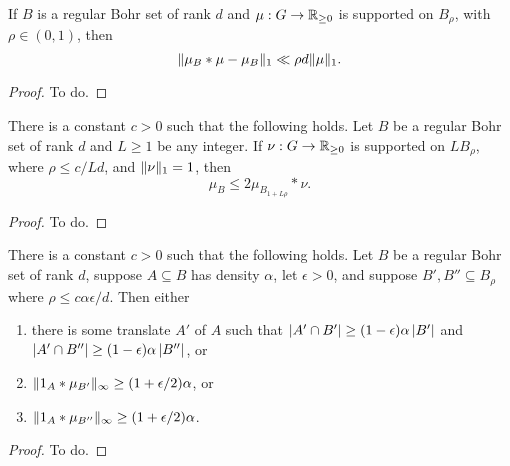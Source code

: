 \begin{lemma}
\label{reg-conv}
If $B$ is a regular Bohr set of rank $d$ and $\mu:G\to\mathbb{R}_{\geq 0}$ is supported on $B_\rho$, with $\rho \in (0,1)$, then
\[ \lVert  \mu_B*\mu - \mu_B \rVert_{1} \ll \rho d\lVert \mu\rVert_1. \]
\end{lemma}
\begin{proof}
To do.
\end{proof}

\begin{lemma}
\label{bohr-majorise}
There is a constant $c>0$ such that the following holds.  Let $B$ be a regular Bohr set of rank $d$ and $L\geq 1$ be any integer. If $\nu:G\to\mathbb{R}_{\geq 0}$ is supported on $L B_\rho$, where $\rho \leq c/Ld$, and $\lVert \nu\rVert_1=1$, then
\[\mu_B \leq 2\mu_{B_{1+L\rho}}\ast \nu.\]
\end{lemma}
\begin{proof}
To do.
\end{proof}

\begin{lemma}
\label{bourgain-trick}
There is a constant $c>0$ such that the following holds. Let $B$ be a regular Bohr set of rank $d$, suppose $A\subseteq B$ has density $\alpha$, let $\epsilon>0$, and suppose $B',B''\subseteq B_\rho$ where $\rho\leq c\alpha\epsilon/d$. Then either
\begin{enumerate}
\item there is some translate $A'$ of $A$ such that $\left\lvert A'\cap B'\right\rvert\geq (1-\epsilon)\alpha\left\lvert B'\right\rvert$ and $\left\lvert A'\cap B''\right\rvert\geq (1-\epsilon)\alpha \left\lvert B''\right\rvert$, or
\item $\lVert 1_{A}\ast \mu_{B'}\rVert_\infty\geq (1+\epsilon/2)\alpha$, or
\item $\lVert 1_{A}\ast \mu_{B''}\rVert_\infty \geq (1+\epsilon/2)\alpha$.
\end{enumerate}
\end{lemma}
\begin{proof}
To do.
\end{proof}
